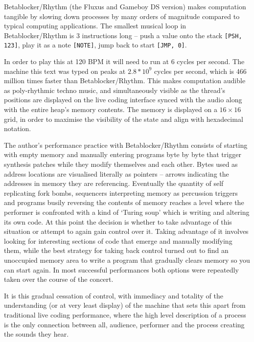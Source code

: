 \documentclass[letterpaper, 12pt]{article}
\begin{document}
Betablocker/Rhythm (the Fluxus and Gameboy DS version) makes computation tangible by slowing down processes by many orders of magnitude compared to typical computing applications.
The smallest musical loop in Betablocker/Rhythm is 3 instructions long -- push a value onto the stack \texttt{[PSH, 123]}, play it as a note \texttt{[NOTE]}, jump back to start \texttt{[JMP, 0]}.

In order to play this at 120 BPM it will need to run at 6 cycles per second. The machine this text was typed on peaks at $2.8*10^9$ cycles per second, which is 466 million times faster than Betablocker/Rhythm.
This makes computation audible as poly-rhythmic techno music, and simultaneously visible as the thread's positions are displayed on the live coding interface synced with the audio along with the entire heap's memory contents. The memory is displayed on a $16\times16$ grid, in order to maximise the visibility of the state and align with hexadecimal notation.

The author's performance practice with Betablocker/Rhythm consists of starting with empty memory and manually entering programs byte by byte that trigger synthesis patches while they modify themselves and each other. 
Bytes used as address locations are visualised literally as pointers -- arrows indicating the addresses in memory they are referencing.
Eventually the quantity of self replicating fork bombs, sequencers interpreting memory as percussion triggers and programs busily reversing the contents of memory reaches a level where the performer is confronted with a kind of `Turing soup' which is writing and altering its own code.
At this point the decision is whether to take advantage of this situation or attempt to again gain control over it.
Taking advantage of it involves looking for interesting sections of code that emerge and manually modifying them, while the best strategy for taking back control turned out to find an unoccupied memory area to write a program that gradually clears memory so you can start again.
In most successful performances both options were repeatedly taken over the course of the concert.

It is this gradual cessation of control, with immediacy and totality of the understanding (or at very least display) of the machine that sets this apart from traditional live coding performance, where the high level description of a process is the only connection between all, audience, performer and the process creating the sounds they hear.
\parskip 18pt
\end{document}
